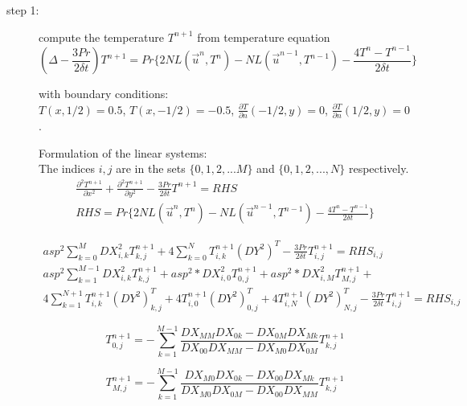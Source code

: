 \documentclass[12pt]{article}
\begin{document}
\begin{description}
\item[step 1:] compute the temperature $T^{n+1}$ from temperature equation\\
\begin{equation}
(\Delta -\frac{3Pr}{2\delta t}) T^{n+1} = Pr \{ 2NL(\vec{u}^{n},T^{n}) 
- NL(\vec{u}^{n-1},T^{n-1}) - \frac{4T^{n}-T^{n-1}}{2\delta t} \}
\end{equation}

with boundary conditions: \\
  $ T(x, 1/2) = 0.5$,
  $ T(x,-1/2) =-0.5$,
  $ \frac{\partial T}{\partial n}(-1/2,y) = 0 $,
  $ \frac{\partial T}{\partial n}( 1/2,y) = 0 $.

Formulation of the linear systems:\\
The indices $i,j$ are in the sets $\{0,1,2,...M\}$ and $\{ 0,1,2,...,N\}$ respectively.
\begin{align}
  \frac{\partial^{2} T^{n+1}}{\partial x^{2}}
 +\frac{\partial^{2} T^{n+1}}{\partial y^{2}}
 -\frac{3Pr}{2\delta t}T^{n+1}  = RHS \\
RHS = Pr \{ 2NL(\vec{u}^{n},T^{n}) - NL(\vec{u}^{n-1},T^{n-1}) 
  - \frac{4T^{n}-T^{n-1}}{2\delta t} \}
\end{align}

\begin{multline}
  asp^{2}\sum_{k=0}^{M}DX^{2}_{i,k}T_{k,j}^{n+1} +
  4\sum_{k=0}^{N}T_{i,k}^{n+1}(DY^{2})^{T}
  - \frac{3Pr}{2\delta t}T_{i,j}^{n+1} = RHS_{i,j}\\
  asp^{2}\sum_{k=1}^{M-1}DX^{2}_{i,k}T_{k,j}^{n+1}  
 +asp^{2}*DX^{2}_{i,0}T_{0,j}^{n+1} 
 +asp^{2}*DX^{2}_{i,M}T_{M,j}^{n+1}+\\
  4\sum_{k=1}^{N+1}T_{i,k}^{n+1}(DY^{2})^{T}_{k,j}
  +4T_{i,0}^{n+1}(DY^{2})^{T}_{0,j}
  +4T_{i,N}^{n+1}(DY^{2})^{T}_{N,j}
  -\frac{3Pr}{2\delta t}T_{i,j}^{n+1} = RHS_{i,j}
\end{multline}

\begin{equation}
  T_{0,j}^{n+1} =
-\sum_{k=1}^{M-1}\frac{DX_{MM}DX_{0k}-DX_{0M}DX_{Mk}}
  {DX_{00}DX_{MM}-DX_{M0}DX_{0M}} T_{k,j}^{n+1}
\end{equation}

\begin{equation}
  T_{M,j}^{n+1} =
-\sum_{k=1}^{M-1}\frac{DX_{M0}DX_{0k}-DX_{00}DX_{Mk}}
  {DX_{M0}DX_{0M}-DX_{00}DX_{MM}} T_{k,j}^{n+1}
\end{equation}


\end{description}
\end{document}
